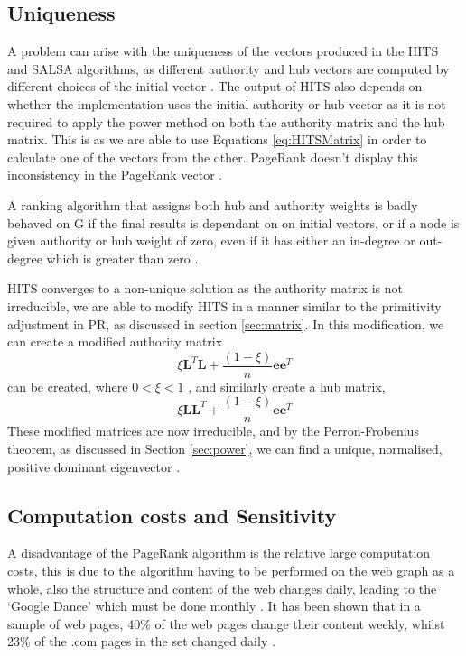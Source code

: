 \documentclass[11pt]{report}
\begin{document}
\subsection*{Uniqueness}
A problem can arise with the uniqueness of the vectors produced in the HITS and SALSA algorithms, as different authority and hub vectors are computed by different choices of the initial vector \cite{langville}. The output of HITS also depends on whether the implementation uses the initial authority or hub vector as it is not required to apply the power method on both the authority matrix and the hub matrix. This is as we are able to use Equations \eqref{eq:HITSMatrix} in order to calculate one of the vectors from the other. PageRank doesn't display this inconsistency in the PageRank vector \cite{farahat2006authority}. 

A ranking algorithm that assigns both hub and authority weights is badly behaved on G if the final results is dependant on on initial vectors, or if a node is given authority or hub weight of zero, even if it has either an in-degree or out-degree which is greater than zero \cite{bonato}.

HITS converges to a non-unique solution as the authority matrix is not irreducible, we are able to modify HITS in a manner similar to the primitivity adjustment in PR, as discussed in section \ref{sec:matrix}. In this modification, we can create a modified authority matrix 
\[\xi\textbf{L}^T\textbf{L} +\frac{(1-\xi)}{n}\textbf{ee}^T\] 
can be created, where $0<\xi<1$ \cite{ng2001stable}, and similarly create a hub matrix,
\[\xi\textbf{LL}^T +\frac{(1-\xi)}{n}\textbf{ee}^T\] 
These modified matrices are now irreducible, and by the Perron-Frobenius theorem, as discussed in Section \ref{sec:power}, we can find a unique, normalised, positive dominant eigenvector \cite{meyer2000matrix}.

\subsection*{Computation costs and Sensitivity}
A disadvantage of the PageRank algorithm is the relative large computation costs, this is due to the algorithm having to be performed on the web graph as a whole, also the structure and content of the web changes daily, leading to the `Google Dance' which must be done monthly \cite{thorson2004modeling}. It has been shown that in a sample of web pages, 40\% of the web pages change their content weekly, whilst 23\% of the .com pages in the set changed daily \cite{cho1999evolution}. 
\end{document}

